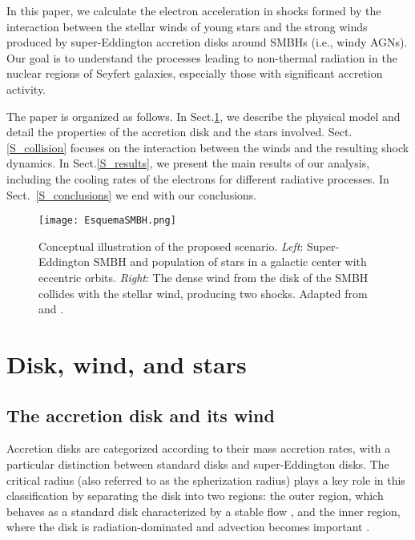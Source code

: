 \documentclass[baaa]{baaa}
\begin{document}
In this paper, we calculate the electron acceleration in shocks formed by the interaction between the stellar winds of young stars and the strong winds produced by super-Eddington accretion disks around SMBHs (i.e., windy AGNs). Our goal is to understand the processes leading to non-thermal radiation in the nuclear regions of Seyfert galaxies, especially those with significant accretion activity.

The paper is organized as follows. In Sect.\ref{S_model}, we describe the physical model and detail the properties of the accretion disk and the stars involved. Sect.\ref{S_collision} focuses on the interaction between the winds and the resulting shock dynamics. In Sect.\ref{S_results}, we present the main results of our analysis, including the cooling rates of the electrons for different radiative processes. In Sect.~\ref{S_conclusions} we end with our conclusions.


\begin{figure*}[h]
\centering
\texttt{[image: EsquemaSMBH.png]} 
\caption{Conceptual illustration of the proposed scenario. \textit{Left}: Super-Eddington SMBH and population of stars in a galactic center with eccentric orbits. \textit{Right}: The dense wind from the disk of the SMBH collides with the stellar wind, producing two shocks. Adapted from \cite{2023A&A...671A...9A} and \cite{2024A&A...691A..73A}.}
\end{figure*} 




\section{Disk, wind, and stars}\label{S_model}
\subsection{The accretion disk and its wind}
Accretion disks are categorized according to their mass accretion rates, with a particular distinction between standard disks and super-Eddington disks. The critical radius (also referred to as the spherization radius) plays a key role in this classification by separating the disk into two regions: the outer region, which behaves as a standard disk characterized by a stable flow \citep{1973IAUS...55..155S}, and the inner region, where the disk is radiation-dominated and advection becomes important \citep{2004PASJ...56..569F}.
\end{document}
